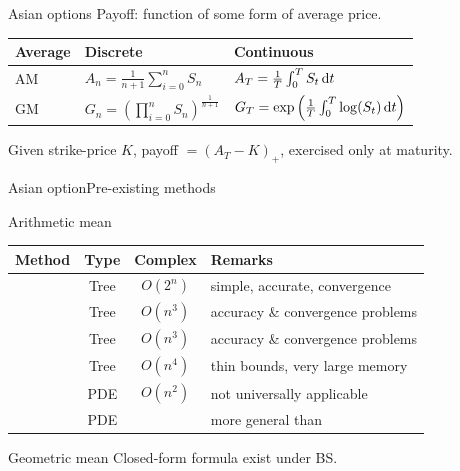 \documentclass[utf8,t,xcolor=svgnames]{beamer}
\begin{document}
\begin{frame}{Asian options}
	Payoff: function of some form of average price.
	
	\bigskip
	
	\begin{tabular}{lll}
		\toprule
		Average  &  Discrete  &  Continuous  \\
		\midrule
		AM  &  $ A_n = \frac{1}{n+1} \sum_{i=0}^{n} S_n $  &  $ A_T = \frac{1}{T} \int_{0}^{T} S_t \dif t $  \\
		GM  &  $ G_n = \left( \prod_{i=0}^{n} S_n \right)^{\frac{1}{n+1}} $  &  $  
		G_T = \exp \left(  \frac{1}{T} \int_{0}^{T} \log(S_t) \dif t  \right) $  \\
		\bottomrule
	\end{tabular}
	
	\bigskip
	
	\begin{example}
		Given strike-price $ K $, payoff $ = (A_T - K)_+ $, exercised only at maturity.
	\end{example}	
\end{frame}


\begin{frame}{Asian option}{Pre-existing methods}
	\begin{block}{Arithmetic mean}
		\begin{tabular}{cccl}
			\toprule
			Method  &  Type  &  Complex  &  Remarks  \\
			\midrule
			\cite{Cox1979}  &  Tree  &  \alert{$ O(2^n) $}  &  simple, accurate, convergence  \\
			\cite{Hull1993}  &  Tree  &  $ O(n^3) $  &  accuracy \& convergence problems  \\
			\cite{Barraquand1996}  &  Tree  &  $ O(n^3) $  &  accuracy \& convergence problems  \\
			\cite{Chalasani1999}  &  Tree  &  $ O(n^4) $  &  thin bounds, very large memory  \\
			\cite{Vecer2001}  &  PDE  &  $ O(n^2) $  &  not universally applicable  \\
			\cite{dHalluin2005}  &  PDE  &    &  more general than \cite{Vecer2001} \\
			\bottomrule
		\end{tabular}
	\end{block}
	
	\bigskip
	
	\begin{block}{Geometric mean}
		Closed-form formula exist under BS.
	\end{block}
\end{frame}
\end{document}
